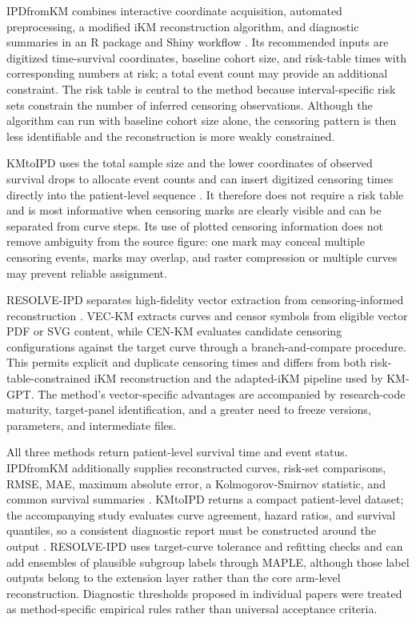 \documentclass[12pt,letterpaper]{article}
\begin{document}
IPDfromKM combines interactive coordinate acquisition, automated preprocessing, a modified iKM reconstruction algorithm, and diagnostic summaries in an R package and Shiny workflow \cite{liu2021}. Its recommended inputs are digitized time-survival coordinates, baseline cohort size, and risk-table times with corresponding numbers at risk; a total event count may provide an additional constraint. The risk table is central to the method because interval-specific risk sets constrain the number of inferred censoring observations. Although the algorithm can run with baseline cohort size alone, the censoring pattern is then less identifiable and the reconstruction is more weakly constrained.

KMtoIPD uses the total sample size and the lower coordinates of observed survival drops to allocate event counts and can insert digitized censoring times directly into the patient-level sequence \cite{rogula2022}. It therefore does not require a risk table and is most informative when censoring marks are clearly visible and can be separated from curve steps. Its use of plotted censoring information does not remove ambiguity from the source figure: one mark may conceal multiple censoring events, marks may overlap, and raster compression or multiple curves may prevent reliable assignment.

RESOLVE-IPD separates high-fidelity vector extraction from censoring-informed reconstruction \cite{resolve2026}. VEC-KM extracts curves and censor symbols from eligible vector PDF or SVG content, while CEN-KM evaluates candidate censoring configurations against the target curve through a branch-and-compare procedure. This permits explicit and duplicate censoring times and differs from both risk-table-constrained iKM reconstruction and the adapted-iKM pipeline used by KM-GPT. The method's vector-specific advantages are accompanied by research-code maturity, target-panel identification, and a greater need to freeze versions, parameters, and intermediate files.

All three methods return patient-level survival time and event status. IPDfromKM additionally supplies reconstructed curves, risk-set comparisons, RMSE, MAE, maximum absolute error, a Kolmogorov-Smirnov statistic, and common survival summaries \cite{liu2021}. KMtoIPD returns a compact patient-level dataset; the accompanying study evaluates curve agreement, hazard ratios, and survival quantiles, so a consistent diagnostic report must be constructed around the output \cite{rogula2022}. RESOLVE-IPD uses target-curve tolerance and refitting checks and can add ensembles of plausible subgroup labels through MAPLE, although those label outputs belong to the extension layer rather than the core arm-level reconstruction. Diagnostic thresholds proposed in individual papers were treated as method-specific empirical rules rather than universal acceptance criteria.
\end{document}
